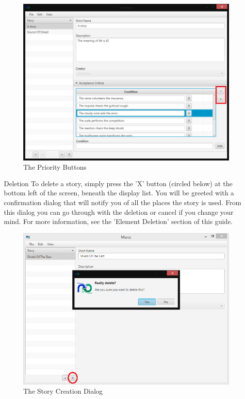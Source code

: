 \begin{figure}[H]
\centering
\includegraphics[width=\textwidth]{images/screenshots/AcceptanceCriteria3.PNG}
\caption{The Priority Buttons}
\label{fig:new_project}
\end{figure}

Deletion
To delete a story, simply press the 'X' button (circled below) at the bottom left of the screen, beneath the display list. You will be greeted with a confirmation dialog that will notify you of all the places the story is used. From this dialog you can go through with the deletion or cancel if you change your mind. For more information, see the 'Element Deletion' section of this guide.

\begin{figure}[H]
\centering
\includegraphics[width=\textwidth]{images/screenshots/stories5.PNG}
\caption{The Story Creation Dialog}
\label{fig:new_project}
\end{figure}